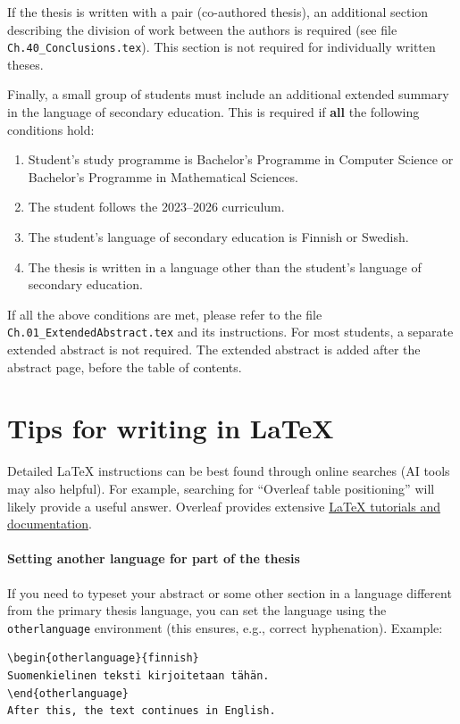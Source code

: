 \documentclass[english, manual, a4paper]{csthesis}
\begin{document}
If the thesis is written with a pair (co-authored thesis), an additional section describing the division of work between the authors is required (see file \texttt{Ch.40\_Conclusions.tex}). This section is not required for individually written theses.

Finally, a small group of students must include an additional extended summary in the language of secondary education. This is required if {\bf all} the following conditions hold:
\begin{enumerate}
    \item Student's study programme is Bachelor’s Programme in Computer Science or Bachelor’s Programme in Mathematical Sciences.
    \item The student follows the 2023--2026 curriculum.
    \item The student's language of secondary education is Finnish or Swedish.
    \item The thesis is written in a language other than the student's language of secondary education.
\end{enumerate}
If all the above conditions are met, please refer to the file \texttt{Ch.01\_ExtendedAbstract.tex} and its instructions. For most students, a separate extended abstract is not required. 
The extended abstract is added after the abstract page, before the table of contents.

\section{Tips for writing in \LaTeX}\label{app:latex-hints}

Detailed \LaTeX{} instructions can be best found through online searches (AI tools may also helpful). For example, searching for “Overleaf table positioning” will likely provide a useful answer. Overleaf provides extensive  \href{https://www.overleaf.com/learn}{\LaTeX{} tutorials and documentation}.

\paragraph{Setting another language for part of the thesis}
If you need to typeset your abstract or some other section in a language different from the primary thesis language, you can set the language using the \texttt{otherlanguage} environment (this ensures, e.g., correct hyphenation). 
Example:

\begin{verbatim}
\begin{otherlanguage}{finnish} 
Suomenkielinen teksti kirjoitetaan tähän.
\end{otherlanguage}
After this, the text continues in English.
\end{verbatim}
\end{document}
